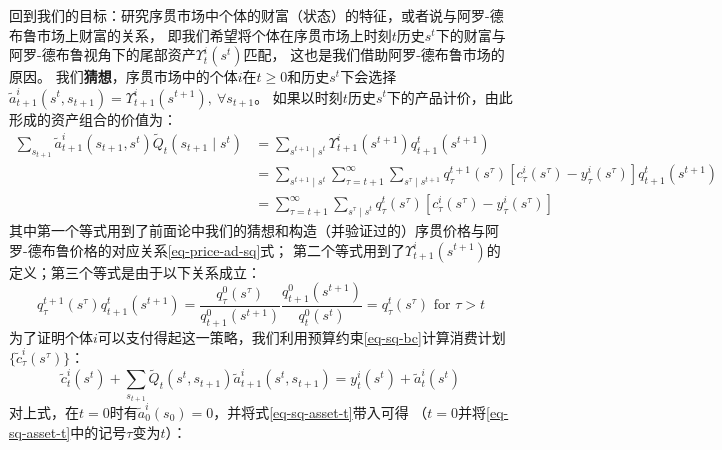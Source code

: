 回到我们的目标：研究序贯市场中个体的财富（状态）的特征，或者说与阿罗-德布鲁市场上财富的关系，
即我们希望将个体在序贯市场上时刻$t$历史$s^t$下的财富与阿罗-德布鲁视角下的尾部资产$\Upsilon_t^i\left(s^t\right)$匹配，
这也是我们借助阿罗-德布鲁市场的原因。
我们\textbf{猜想}，序贯市场中的个体$i$在$t\geq0$和历史$s^t$下会选择
$\tilde{a}_{t+1}^i\left(s^t,s_{t+1}\right)=\Upsilon_{t+1}^i\left(s^{t+1}\right), ~\forall s_{t+1}$。
如果以时刻$t$历史$s^t$下的产品计价，由此形成的资产组合的价值为：
\begin{equation}    \label{eq-sq-asset-t}
    \begin{aligned}
        \sum_{s_{t+1}} \tilde{a}_{t+1}^i\left(s_{t+1}, s^t\right) \tilde{Q}_t\left(s_{t+1} \mid s^t\right) & =
            \sum_{s^{t+1} \mid s^t} \Upsilon_{t+1}^i\left(s^{t+1}\right) q_{t+1}^t\left(s^{t+1}\right) \\
            &= \sum_{s^{t+1} \mid s^t} 
                \sum_{\tau=t+1}^{\infty} \sum_{s^\tau \mid s^{t+1}} q_\tau^{t+1}\left(s^\tau\right)
                    \left[c_\tau^i\left(s^\tau\right)-y_\tau^i\left(s^\tau\right)\right] q_{t+1}^t\left(s^{t+1}\right)  \\
            &= \sum_{\tau=t+1}^{\infty} \sum_{s^\tau \mid s^t} q_\tau^t\left(s^\tau\right)
                \left[c_\tau^i\left(s^\tau\right)-y_\tau^i\left(s^\tau\right)\right]
        \end{aligned}
\end{equation}
其中第一个等式用到了前面论中我们的猜想和构造（并验证过的）序贯价格与阿罗-德布鲁价格的对应关系\ref{eq-price-ad-sq}式；
第二个等式用到了$\Upsilon_{t+1}^i\left(s^{t+1}\right)$的定义；第三个等式是由于以下关系成立：
\begin{equation*}
    q_\tau^{t+1}\left(s^\tau\right) q_{t+1}^t\left(s^{t+1}\right)
        =\frac{q_\tau^0\left(s^\tau\right)}{q_{t+1}^0\left(s^{t+1}\right)} 
            \frac{q_{t+1}^0\left(s^{t+1}\right)}{q_t^0\left(s^t\right)}=q_\tau^t\left(s^\tau\right) \text { for } \tau>t
\end{equation*}
为了证明个体$i$可以支付得起这一策略，我们利用预算约束\ref{eq-sq-bc}计算消费计划$\{\tilde{c}_{\tau}^i\left(s^{\tau}\right)\}$：
\begin{equation*} 
    \tilde{c}_t^i\left(s^t\right)+\sum_{s_{t+1}} \tilde{Q}_t\left(s^t, s_{t+1}\right) \tilde{a}_{t+1}^i\left(s^t, s_{t+1}\right) 
        = y_t^i\left(s^t\right)+\tilde{a}_t^i\left(s^t\right)
\end{equation*}
对上式，在$t=0$时有$\tilde{a}_0^i\left(s_0\right)=0$，并将式\ref{eq-sq-asset-t}带入可得
（$t=0$并将\ref{eq-sq-asset-t}中的记号$\tau$变为$t$）：
